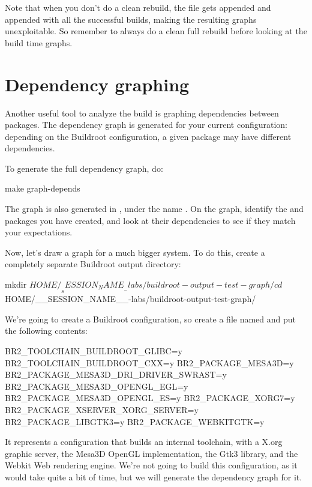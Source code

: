 Note that when you don't do a clean rebuild, the 
file gets appended and appended with all the successful builds, making
the resulting graphs unexploitable. So remember to always do a clean
full rebuild before looking at the build time graphs.

\section{Dependency graphing}

Another useful tool to analyze the build is graphing dependencies
between packages. The dependency graph is generated for your current
configuration: depending on the Buildroot configuration, a given
package may have different dependencies.

To generate the full dependency graph, do:

\begin{bashinput}
make graph-depends
\end{bashinput}

The graph is also generated in , under the name
. On the graph, identify the  and
 packages you have created, and look at their
dependencies to see if they match your expectations.

Now, let's draw a graph for a much bigger system. To do this, create a
completely separate Buildroot output directory:

\begin{bashinput}
mkdir $HOME/__SESSION_NAME__-labs/buildroot-output-test-graph/
cd $HOME/__SESSION_NAME__-labs/buildroot-output-test-graph/
\end{bashinput}

We're going to create a Buildroot configuration, so create a file
named  and put the following contents:

\begin{fileinput}
BR2_TOOLCHAIN_BUILDROOT_GLIBC=y
BR2_TOOLCHAIN_BUILDROOT_CXX=y
BR2_PACKAGE_MESA3D=y
BR2_PACKAGE_MESA3D_DRI_DRIVER_SWRAST=y
BR2_PACKAGE_MESA3D_OPENGL_EGL=y
BR2_PACKAGE_MESA3D_OPENGL_ES=y
BR2_PACKAGE_XORG7=y
BR2_PACKAGE_XSERVER_XORG_SERVER=y
BR2_PACKAGE_LIBGTK3=y
BR2_PACKAGE_WEBKITGTK=y
\end{fileinput}

It represents a configuration that builds an internal toolchain, with
a X.org graphic server, the Mesa3D OpenGL implementation, the Gtk3
library, and the Webkit Web rendering engine. We're not going to build
this configuration, as it would take quite a bit of time, but we will
generate the dependency graph for it.

